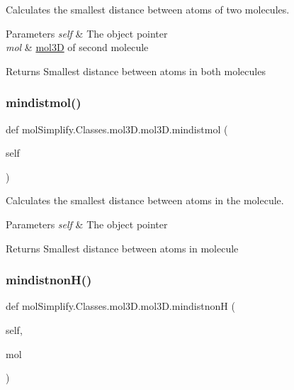 Calculates the smallest distance between atoms of two molecules. 


\begin{DoxyParams}{Parameters}
{\em self} & The object pointer \\
\hline
{\em mol} & \hyperlink{classmolSimplify_1_1Classes_1_1mol3D_1_1mol3D}{mol3D} of second molecule \\
\hline
\end{DoxyParams}
\begin{DoxyReturn}{Returns}
Smallest distance between atoms in both molecules 
\end{DoxyReturn}
\mbox{\label{classmolSimplify_1_1Classes_1_1mol3D_1_1mol3D_abc383cd8e5f7a2963b5b220fe5f23c02}} 
\subsubsection{\texorpdfstring{mindistmol()}{mindistmol()}}
{\footnotesize\ttfamily def mol\+Simplify.\+Classes.\+mol3\+D.\+mol3\+D.\+mindistmol (\begin{DoxyParamCaption}\item[{}]{self }\end{DoxyParamCaption})}



Calculates the smallest distance between atoms in the molecule. 


\begin{DoxyParams}{Parameters}
{\em self} & The object pointer \\
\hline
\end{DoxyParams}
\begin{DoxyReturn}{Returns}
Smallest distance between atoms in molecule 
\end{DoxyReturn}
\mbox{\label{classmolSimplify_1_1Classes_1_1mol3D_1_1mol3D_a613d343492efdeda0c47700654157b3d}} 
\subsubsection{\texorpdfstring{mindistnon\+H()}{mindistnonH()}}
{\footnotesize\ttfamily def mol\+Simplify.\+Classes.\+mol3\+D.\+mol3\+D.\+mindistnonH (\begin{DoxyParamCaption}\item[{}]{self,  }\item[{}]{mol }\end{DoxyParamCaption})}



